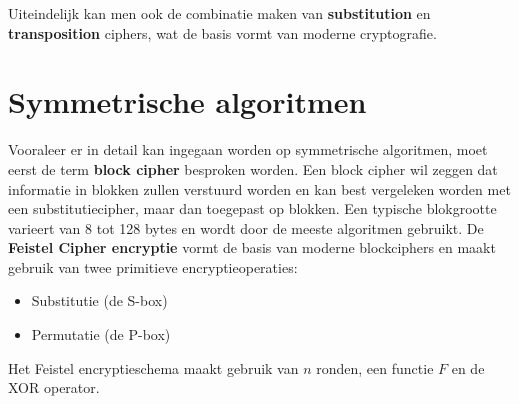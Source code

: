 \documentclass{report}
\begin{document}
	Uiteindelijk kan men ook de combinatie maken van \textbf{substitution} en \textbf{transposition} ciphers, wat de basis vormt van moderne cryptografie.

	\section{Symmetrische algoritmen}
	Vooraleer er in detail kan ingegaan worden op symmetrische algoritmen, moet eerst de term \textbf{block cipher} besproken worden. Een block cipher wil zeggen dat informatie in blokken zullen verstuurd worden en kan best vergeleken worden met een substitutiecipher, maar dan toegepast op blokken. Een typische blokgrootte varieert van 8 tot 128 bytes en wordt door de meeste algoritmen gebruikt. De \textbf{Feistel Cipher encryptie} vormt de basis van moderne blockciphers en maakt gebruik van twee primitieve encryptieoperaties:
	\begin{itemize}
		\item Substitutie (de S-box)
		\item Permutatie  (de P-box)
	\end{itemize}
	Het Feistel encryptieschema maakt gebruik van $n$ ronden, een functie $F$ en de XOR operator. 
\end{document}
